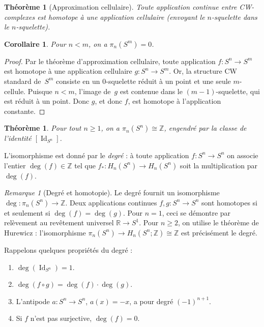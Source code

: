 \documentclass[12pt,a4paper,openany]{book}
\theoremstyle{definition}
\theoremstyle{plain}
\newtheorem{theoreme}[definition]{Théorème}
\newtheorem{corollaire}[definition]{Corollaire}
\theoremstyle{remark}
\newtheorem{remarque}[definition]{Remarque}
\newcommand{\Z}{\mathbb{Z}}
\newcommand{\R}{\mathbb{R}}
\DeclareMathOperator{\Id}{Id}
\begin{document}
\begin{theoreme}[Approximation cellulaire]\label{thm:approx-cellulaire}
  Toute application continue entre CW-complexes est homotope à une application
  cellulaire (envoyant le $n$-squelette dans le $n$-squelette).
\end{theoreme}

\begin{corollaire}\label{cor:pi-n-spheres-nul}
  Pour $n < m$, on a $\pi_n(S^m) = 0$.
\end{corollaire}

\begin{proof}
  Par le théorème d'approximation cellulaire, toute application $f \colon S^n \to S^m$
  est homotope à une application cellulaire $g \colon S^n \to S^m$. Or, la structure
  CW standard de~$S^m$ consiste en un $0$-squelette réduit à un point et une seule
  $m$-cellule. Puisque $n < m$, l'image de~$g$ est contenue dans le
  $(m-1)$-squelette, qui est réduit à un point. Donc $g$, et donc $f$, est
  homotope à l'application constante.
\end{proof}

\begin{theoreme}\label{thm:pi-n-sn}
  Pour tout $n \geq 1$, on a $\pi_n(S^n) \cong \Z$, engendré par la classe de
  l'identité $[\Id_{S^n}]$.
\end{theoreme}

L'isomorphisme est donné par le \emph{degré} :
à toute application $f \colon S^n \to S^n$ on associe l'entier $\deg(f) \in \Z$
tel que $f_* \colon H_n(S^n) \to H_n(S^n)$ soit la multiplication par $\deg(f)$.

\begin{remarque}[Degré et homotopie]\label{rem:degre-homotopie}
  Le degré fournit un isomorphisme $\deg \colon \pi_n(S^n) \to \Z$.
  Deux applications continues $f, g \colon S^n \to S^n$ sont homotopes si et
  seulement si $\deg(f) = \deg(g)$. Pour $n = 1$, ceci se démontre par relèvement
  au revêtement universel $\R \to S^1$. Pour $n \geq 2$, on utilise le théorème
  de Hurewicz : l'isomorphisme $\pi_n(S^n) \to H_n(S^n; \Z) \cong \Z$ est
  précisément le degré.

  Rappelons quelques propriétés du degré :
  \begin{enumerate}[label=(\roman*)]
    \item $\deg(\Id_{S^n}) = 1$.
    \item $\deg(f \circ g) = \deg(f) \cdot \deg(g)$.
    \item L'antipode $a \colon S^n \to S^n$, $a(x) = -x$, a pour degré $(-1)^{n+1}$.
    \item Si $f$ n'est pas surjective, $\deg(f) = 0$.
  \end{enumerate}
\end{remarque}
\end{document}
